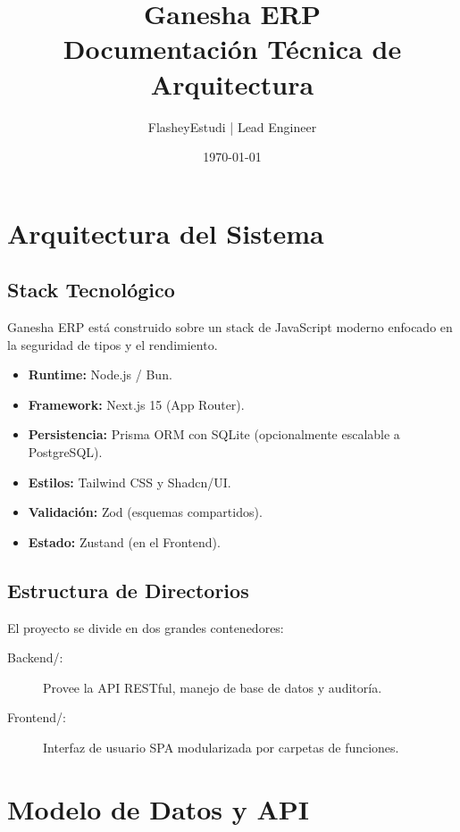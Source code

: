 \documentclass[12pt]{report}
\title{
    \Huge\bfseries\color{DevBlue} Ganesha ERP\\[0.5cm]
    \Large Documentación Técnica de Arquitectura
}
\author{FlasheyEstudi | Lead Engineer}
\date{\today}
\begin{document}
\maketitle
\tableofcontents

\chapter{Arquitectura del Sistema}

\section{Stack Tecnológico}
Ganesha ERP está construido sobre un stack de JavaScript moderno enfocado en la seguridad de tipos y el rendimiento.
\begin{itemize}
    \item \textbf{Runtime:} Node.js / Bun.
    \item \textbf{Framework:} Next.js 15 (App Router).
    \item \textbf{Persistencia:} Prisma ORM con SQLite (opcionalmente escalable a PostgreSQL).
    \item \textbf{Estilos:} Tailwind CSS y Shadcn/UI.
    \item \textbf{Validación:} Zod (esquemas compartidos).
    \item \textbf{Estado:} Zustand (en el Frontend).
\end{itemize}

\section{Estructura de Directorios}
El proyecto se divide en dos grandes contenedores:
\begin{description}
    \item[Backend/:] Provee la API RESTful, manejo de base de datos y auditoría.
    \item[Frontend/:] Interfaz de usuario SPA modularizada por carpetas de funciones.
\end{description}

\chapter{Modelo de Datos y API}
\end{document}
